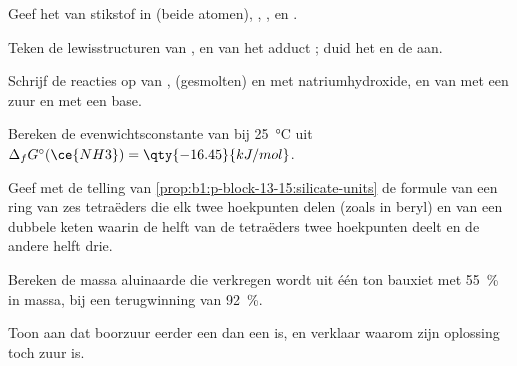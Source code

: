 \begin{exercise}[$\star$]\label{exo:b1:p-block-13-15:1}
Geef het  van stikstof in  (beide atomen),
, ,  en .
\end{exercise}

\begin{exercise}[$\star$]\label{exo:b1:p-block-13-15:2}
Teken de lewisstructuren van ,  en van het adduct
; duid het  en de  aan.
\end{exercise}

\begin{exercise}[$\star$]\label{exo:b1:p-block-13-15:3}
Schrijf de reacties op van ,  (gesmolten) en 
met natriumhydroxide, en van  met een zuur en met een base.
\end{exercise}

\begin{exercise}[$\star$]\label{exo:b1:p-block-13-15:4}
Bereken de evenwichtsconstante van  bij
\qty{25}{\celsius} uit $\Delta_f G^\circ(\ce{NH3}) =
\qty{-16.45}{kJ/mol}$.
\end{exercise}

\begin{exercise}[$\star\star$]\label{exo:b1:p-block-13-15:5}
Geef met de telling van \cref{prop:b1:p-block-13-15:silicate-units} de
formule van een ring van zes tetraëders die elk twee hoekpunten delen
(zoals in beryl) en van een dubbele keten waarin de helft van de
tetraëders twee hoekpunten deelt en de andere helft drie.
\end{exercise}

\begin{exercise}[$\star\star$]\label{exo:b1:p-block-13-15:6}
Bereken de massa aluinaarde die verkregen wordt uit één ton bauxiet met
\qty{55}{\percent}  in massa, bij een terugwinning van
\qty{92}{\percent}.
\end{exercise}

\begin{exercise}[$\star\star$]\label{exo:b1:p-block-13-15:7}
Toon aan dat boorzuur eerder een  dan een  is, en
verklaar waarom zijn oplossing toch zuur is.
\end{exercise}

